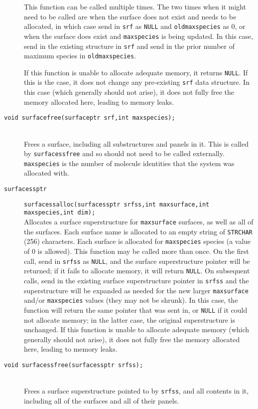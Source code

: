\documentclass {book}
\newcommand {\ttt} {\texttt}
\begin{document}
\begin{description}
This function can be called multiple times. The two times when it might need to be called are when the surface does not exist and needs to be allocated, in which case send in \ttt{srf} as \ttt{NULL} and \ttt{oldmaxspecies} as 0, or when the surface does exist and \ttt{maxspecies} is being updated. In this case, send in the existing structure in \ttt{srf} and send in the prior number of maximum species in \ttt{oldmaxspecies}.

If this function is unable to allocate adequate memory, it returns \ttt{NULL}. If this is the case, it does not change any pre-existing \ttt{srf} data structure. In this case (which generally should not arise), it does not fully free the memory allocated here, leading to memory leaks.

\item[\ttt{void surfacefree(surfaceptr srf,int maxspecies);}]
\hfill \\
Frees a surface, including all substructures and panels in it. This is called by \ttt{surfacessfree} and so should not need to be called externally. \ttt{maxspecies} is the number of molecule identities that the system was allocated with.

\item[\ttt{surfacessptr}]
\ttt{surfacessalloc(surfacessptr srfss,int maxsurface,int maxspecies,int dim);}
\hfill \\
Allocates a surface superstructure for \ttt{maxsurface} surfaces, as well as all of the surfaces. Each surface name is allocated to an empty string of \ttt{STRCHAR} (256) characters. Each surface is allocated for \ttt{maxspecies} species (a value of 0 is allowed). This function may be called more than once. On the first call, send in \ttt{srfss} as \ttt{NULL}, and the surface superstructure pointer will be returned; if it fails to allocate memory, it will return \ttt{NULL}. On subsequent calls, send in the existing surface superstructure pointer in \ttt{srfss} and the superstructure will be expanded as needed for the new larger \ttt{maxsurface} and/or \ttt{maxspecies} values (they may not be shrunk). In this case, the function will return the same pointer that was sent in, or \ttt{NULL} if it could not allocate memory; in the latter case, the original superstructure is unchanged. If this function is unable to allocate adequate memory (which generally should not arise), it does not fully free the memory allocated here, leading to memory leaks.

\item[\ttt{void surfacessfree(surfacessptr srfss);}]
\hfill \\
Frees a surface superstructure pointed to by \ttt{srfss}, and all contents in it, including all of the surfaces and all of their panels.


\end{description}
\end{document}
